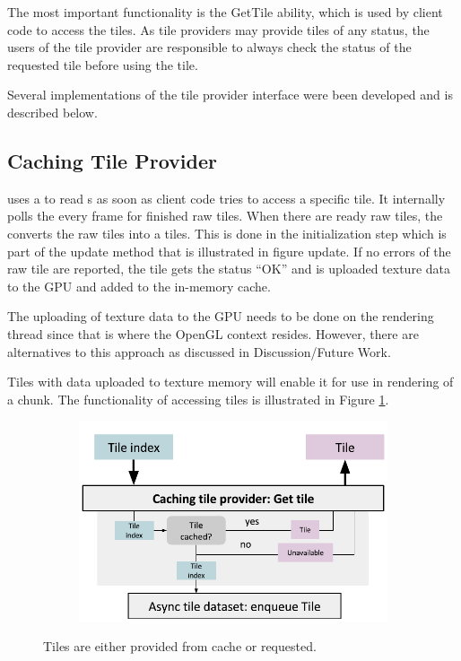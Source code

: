 The most important functionality is the GetTile ability, which is used by client code to access the tiles. As tile providers may provide tiles of any status, the users of the tile provider are responsible to always check the status of the requested tile before using the tile. 

Several implementations of the tile provider interface were been developed and is described below.

\subsection{Caching Tile Provider}
 uses a  to read s as soon as client code tries to access a specific tile. It internally polls the  every frame for finished raw tiles. When there are ready raw tiles, the  converts the raw tiles into a tiles. This is done in the initialization step which is part of the update method that is illustrated in figure update. If no errors of the raw tile are reported, the tile gets the status ``OK'' and is uploaded texture data to the GPU and added to the in-memory cache.

The uploading of texture data to the GPU needs to be done on the rendering thread since that is where the OpenGL context resides. However, there are alternatives to this approach as discussed in Discussion/Future Work. 

Tiles with data uploaded to texture memory will enable it for use in rendering of a chunk. The functionality of accessing tiles is illustrated in Figure \ref{fig:cachingtileprovider_gettile}.

\begin{figure}[htbp]
    \centering
    \begin{subfigure}[bt]{0.8\textwidth}
        \includegraphics[width=\textwidth]{figures/implementation/tileprovider/cachingtileprovider_gettile.pdf}
    \end{subfigure}
    \caption{Tiles are either provided from cache or requested.}
    \label{fig:cachingtileprovider_gettile}
\end{figure}

